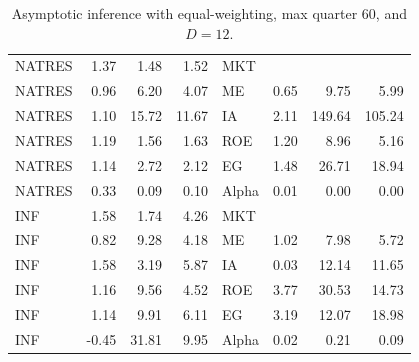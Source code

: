 \documentclass[12pt]{article}
\begin{document}
\begin{table}[ht]
\begin{tabular}{lrrrlrrr}
		NATRES & 1.37 & 1.48 & 1.52 & MKT &  &  &  \\ 
		NATRES & 0.96 & 6.20 & 4.07 & ME & 0.65 & 9.75 & 5.99 \\ 
		NATRES & 1.10 & 15.72 & 11.67 & IA & 2.11 & 149.64 & 105.24 \\ 
		NATRES & 1.19 & 1.56 & 1.63 & ROE & 1.20 & 8.96 & 5.16 \\ 
		NATRES & 1.14 & 2.72 & 2.12 & EG & 1.48 & 26.71 & 18.94 \\ 
		NATRES & 0.33 & 0.09 & 0.10 & Alpha & 0.01 & 0.00 & 0.00 \\ 
		INF & 1.58 & 1.74 & 4.26 & MKT &  &  &  \\ 
		INF & 0.82 & 9.28 & 4.18 & ME & 1.02 & 7.98 & 5.72 \\ 
		INF & 1.58 & 3.19 & 5.87 & IA & 0.03 & 12.14 & 11.65 \\ 
		INF & 1.16 & 9.56 & 4.52 & ROE & 3.77 & 30.53 & 14.73 \\ 
		INF & 1.14 & 9.91 & 6.11 & EG & 3.19 & 12.07 & 18.98 \\ 
		INF & -0.45 & 31.81 & 9.95 & Alpha & 0.02 & 0.21 & 0.09 \\ 
		\hline
	\end{tabular}
	\caption{Asymptotic inference with equal-weighting, max quarter 60, and $D=12$.} 
	\label{tab:ai_60_ew}
\end{table}
\end{document}
